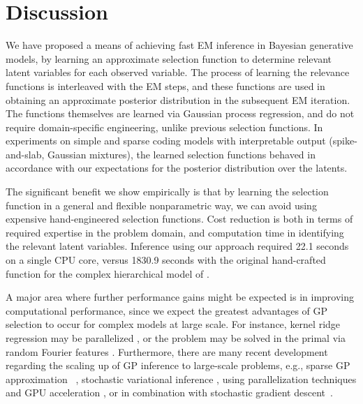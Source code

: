 \section{Discussion}
%
We have proposed a means of achieving fast EM inference in Bayesian generative models, by
learning an approximate selection function to determine relevant latent variables
for each observed variable. The process of learning the relevance functions
is interleaved with the EM steps, and these functions
are used in obtaining an approximate posterior distribution in the subsequent EM iteration.
The functions themselves are learned via Gaussian process regression,
and do not require domain-specific engineering, unlike previous selection functions.
In experiments on simple and sparse coding models with interpretable output (spike-and-slab, Gaussian mixtures),
the learned selection functions behaved in accordance with our expectations for the posterior
distribution over the latents.  

The significant benefit we show empirically is that by learning the selection function in a general and flexible nonparametric way, we can avoid using expensive hand-engineered selection functions.
Cost reduction is both in terms of required expertise in the problem domain, and computation time in identifying the relevant latent variables.
Inference using our approach required 22.1 seconds on a single CPU core, versus  1830.9 seconds with the original hand-crafted function 
for the complex hierarchical model of \citep{DaiLucke2014}.

A major area where further performance gains might be expected is in
improving computational performance, since we expect the greatest
advantages of GP selection to occur for complex models at large scale. For instance,
 kernel ridge regression may be parallelized \citep{zhang14divide},
or the problem may be solved in the primal via random Fourier features \citep{LeSarSmo13}.
Furthermore, there are many recent development regarding the scaling up of GP inference to large-scale problems, e.g., sparse GP approximation
~\citep{sparseGP}, stochastic variational inference \citep{HensmanEtAl2013,Hensman2012}, using parallelization techniques and GPU acceleration \citep{butt}, or in combination with stochastic gradient descent~\cite{Bottou08thetradeoffs}. 

